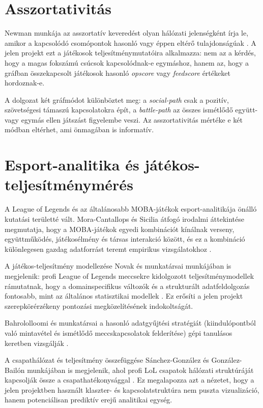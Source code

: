 \section{Asszortativitás}

Newman munkája az asszortatív keveredést olyan hálózati jelenségként írja le, amikor a kapcsolódó csomópontok hasonló vagy éppen eltérő tulajdonságúak \cite{newman2003}. A jelen projekt ezt a játékosok teljesítménymutatóira alkalmazza: nem az a kérdés, hogy a magas fokszámú csúcsok kapcsolódnak-e egymáshoz, hanem az, hogy a gráfban összekapcsolt játékosok hasonló \textit{opscore} vagy \textit{feedscore} értékeket hordoznak-e.

A dolgozat két gráfmódot különböztet meg: a \textit{social-path} csak a pozitív, szövetségesi támaszú kapcsolatokra épít, a \textit{battle-path} az összes ismétlődő együtt- vagy egymás ellen játszást figyelembe veszi. Az asszortativitás mértéke e két módban eltérhet, ami önmagában is informatív.

\section{Esport-analitika és játékos-teljesítménymérés}

A League of Legends és az általánosabb MOBA-játékok esport-analitikája önálló kutatási területté vált. Mora-Cantallops és Sicilia átfogó irodalmi áttekintése megmutatja, hogy a MOBA-játékok egyedi kombinációt kínálnak verseny, együttműködés, játékosélmény és társas interakció között, és ez a kombináció különlegesen gazdag adatforrást teremt empirikus vizsgálatokhoz \cite{moracantallops2019}.

A játékos-teljesítmény modellezése Novak és munkatársai munkájában is megjelenik: profi League of Legends meccsekre kidolgozott teljesítménymodellek rámutatnak, hogy a domainspecifikus változók és a strukturált adatfeldolgozás fontosabb, mint az általános statisztikai modellek \cite{novak2022}. Ez erősíti a jelen projekt szerepkörérzékeny pontozási megközelítésének indokoltságát.

Bahrololloomi és munkatársai a hasonló adatgyűjtési stratégiát (kiindulópontból való mintavétel és ismétlődő meccskapcsolatok felderítése) gépi tanulásos keretben vizsgálják \cite{bahrololloomi2021}.

A csapathálózat és teljesítmény összefüggése Sánchez-González és González-Bailón munkájában is megjelenik, ahol profi LoL csapatok hálózati struktúráját kapcsolják össze a csapathatékonysággal \cite{sanchezgonzalezBailon2023}. Ez megalapozza azt a nézetet, hogy a jelen projektben használt klaszter- és kapcsolatstruktúra nem puszta vizualizáció, hanem potenciálisan prediktív erejű analitikai egység.

